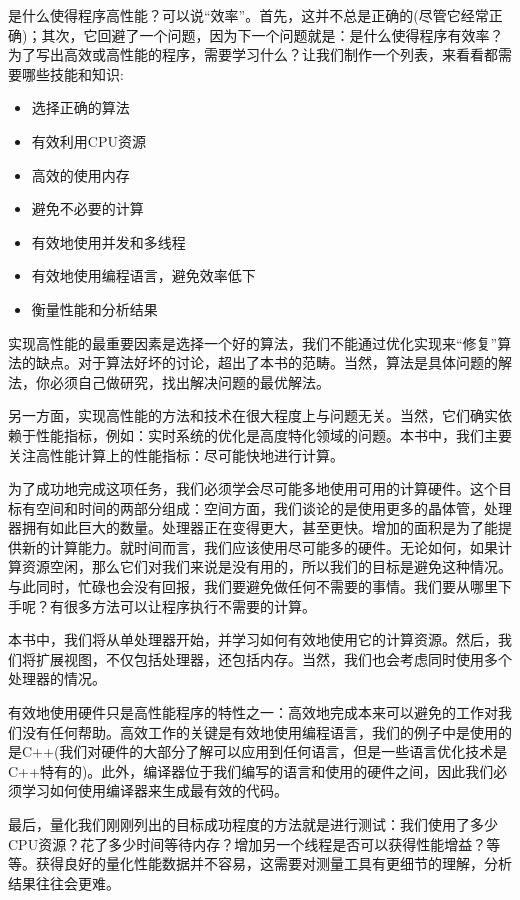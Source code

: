 是什么使得程序高性能？可以说“效率”。首先，这并不总是正确的(尽管它经常正确)；其次，它回避了一个问题，因为下一个问题就是：是什么使得程序有效率？为了写出高效或高性能的程序，需要学习什么？让我们制作一个列表，来看看都需要哪些技能和知识:

\begin{itemize}
\item 选择正确的算法
\item 有效利用CPU资源
\item 高效的使用内存
\item 避免不必要的计算
\item 有效地使用并发和多线程
\item 有效地使用编程语言，避免效率低下
\item 衡量性能和分析结果
\end{itemize}

实现高性能的最重要因素是选择一个好的算法，我们不能通过优化实现来“修复”算法的缺点。对于算法好坏的讨论，超出了本书的范畴。当然，算法是具体问题的解法，你必须自己做研究，找出解决问题的最优解法。

另一方面，实现高性能的方法和技术在很大程度上与问题无关。当然，它们确实依赖于性能指标，例如：实时系统的优化是高度特化领域的问题。本书中，我们主要关注高性能计算上的性能指标：尽可能快地进行计算。

为了成功地完成这项任务，我们必须学会尽可能多地使用可用的计算硬件。这个目标有空间和时间的两部分组成：空间方面，我们谈论的是使用更多的晶体管，处理器拥有如此巨大的数量。处理器正在变得更大，甚至更快。增加的面积是为了能提供新的计算能力。就时间而言，我们应该使用尽可能多的硬件。无论如何，如果计算资源空闲，那么它们对我们来说是没有用的，所以我们的目标是避免这种情况。与此同时，忙碌也会没有回报，我们要避免做任何不需要的事情。我们要从哪里下手呢？有很多方法可以让程序执行不需要的计算。

本书中，我们将从单处理器开始，并学习如何有效地使用它的计算资源。然后，我们将扩展视图，不仅包括处理器，还包括内存。当然，我们也会考虑同时使用多个处理器的情况。

有效地使用硬件只是高性能程序的特性之一：高效地完成本来可以避免的工作对我们没有任何帮助。高效工作的关键是有效地使用编程语言，我们的例子中是使用的是C++(我们对硬件的大部分了解可以应用到任何语言，但是一些语言优化技术是C++特有的)。此外，编译器位于我们编写的语言和使用的硬件之间，因此我们必须学习如何使用编译器来生成最有效的代码。

最后，量化我们刚刚列出的目标成功程度的方法就是进行测试：我们使用了多少CPU资源？花了多少时间等待内存？增加另一个线程是否可以获得性能增益？等等。获得良好的量化性能数据并不容易，这需要对测量工具有更细节的理解，分析结果往往会更难。

